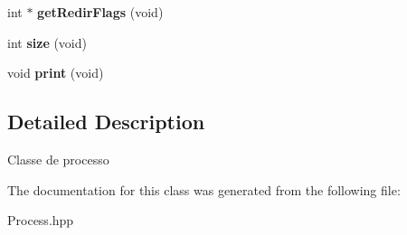 \begin{DoxyCompactItemize}
\item 
\hypertarget{classProcess_ac2fa6cd64f012be1dd57f864f8fe85a3}{
int $\ast$ {\bfseries getRedirFlags} (void)}
\label{classProcess_ac2fa6cd64f012be1dd57f864f8fe85a3}

\item 
\hypertarget{classProcess_aba1961b67fc9143157a356b2c4e45638}{
int {\bfseries size} (void)}
\label{classProcess_aba1961b67fc9143157a356b2c4e45638}

\item 
\hypertarget{classProcess_ab902253708fb4bb5196d6c31f2ddaf21}{
void {\bfseries print} (void)}
\label{classProcess_ab902253708fb4bb5196d6c31f2ddaf21}

\end{DoxyCompactItemize}


\subsection{Detailed Description}
Classe de processo 

The documentation for this class was generated from the following file:\begin{DoxyCompactItemize}
\item 
Process.hpp\end{DoxyCompactItemize}
